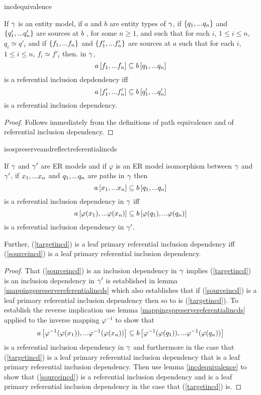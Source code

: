incdequivalence
\begin{lemma}
\label{incdequivalence}
If $\gamma$ is an entity model, 
if $a$ and $b$ are entity types of  $\gamma$,  if $\left\{q_1,...q_n\right\}$
and $\left\{q'_1,...q'_n\right\}$ are sources at $b$ , for some $n \geq 1$,
and such that for each $i$, $1 \leq i \leq n$, $q_i \simeq q'_i$  
and if $\left\{f_1,...f_n\right\}$ and $\left\{f'_1,...f'_n\right\}$ are sources at $a$
such that for each $i$, $1 \leq i \leq n$, $f_i \simeq f'_i$
then. in $\gamma$, 
$$
a\left[f_1,...f_n\right]\subseteq b\left[q_1,...q_n\right]
$$
is a referential inclusion depdendency iff
$$
a\left[f'_1,...f'_n\right]\subseteq b\left[q'_1,...q'_n\right]
$$
is a referential inclusion dependency.

\end{lemma}
\begin{proof}
Follows immediately from the definitions of path equivalence and of referential inclusion dependency.
\end{proof}

isospreserveandreflectreferentialincds
\begin{lemma}
\label{isospreserveandreflectreferentialincds}
If $\gamma$ and $\gamma'$ are ER models and  if  $\varphi$ is an ER model isomorphism between $\gamma$  and $\gamma'$,  
if $x_1,...x_n$ and $q_1,...q_n$ are paths in 
$\gamma$
then 
\begin{equation}
\label{sourceincd}
a\left[x_1,...x_n\right]\subseteq b\left[q_1,...q_n\right]
\end{equation}
is a referential inclusion dependency in $\gamma$ 
iff 
\begin{equation}
\label{targetincd}
a\left[\varphi(x_1),...\varphi(x_n)\right]\subseteq b\left[\varphi(q_1),...\varphi(q_n)\right]
\end{equation}
is a referential inclusion dependency in $\gamma'$. 

Further, (\ref{targetincd}) is a leaf primary referential inclusion dependency  iff (\ref{sourceincd}) is a leaf primary referential inclusion dependency.
\end{lemma}
\begin{proof}
That (\ref{sourceincd}) is an inclusion dependency in $\gamma$ implies 
(\ref{targetincd}) is an inclusion dependency in $\gamma'$ is established in lemma
\ref{mappingspreservereferentialincds} which also
establishes that if (\ref{sourceincd}) is a leaf primary referential inclusion dependency
then so to is (\ref{targetincd}). To establish the reverse implication use lemma
\ref{mappingspreservereferentialincds} applied to the inverse mapping $\varphi^{-1}$
to show that
\begin{equation}
a\left[\varphi^{-1}(\varphi(x_1)),...\varphi^{-1}(\varphi(x_n))\right]\subseteq b\left[\varphi^{-1}(\varphi(q_1)),...\varphi^{-1}(\varphi(q_n))\right]
\end{equation}
is a referential inclusion dependency in $\gamma$  and furthermore in the case that
(\ref{targetincd}) is a leaf primary referential inclusion dependency that is
a leaf primary referential inclusion dependency.
Then use lemma
\ref{incdequivalence} to show that (\ref{sourceincd}) is a referential inclusion dependency
and is a leaf primary referential inclusion dependency in the case that (\ref{targetincd}) is.
\end{proof}


